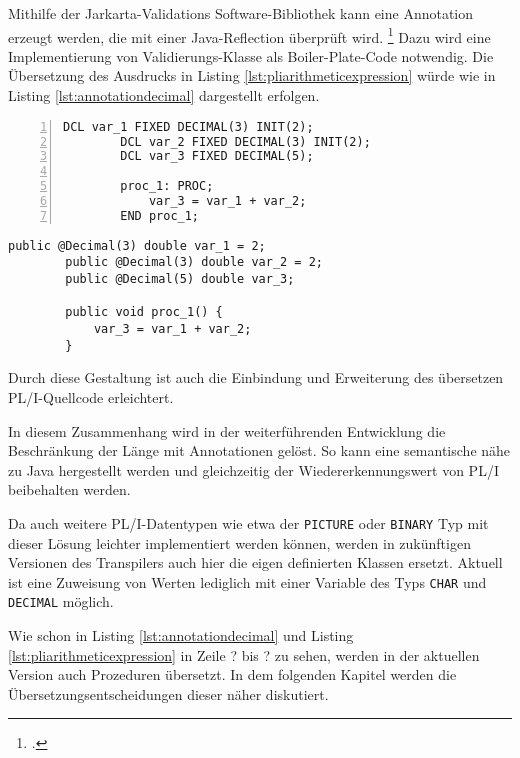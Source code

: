 Mithilfe der Jarkarta-Validations Software-Bibliothek kann eine Annotation erzeugt werden, die mit einer Java-Reflection überprüft wird. \footcite[Vgl. ][]{jakarta}
Dazu wird eine Implementierung von Validierungs-Klasse als Boiler-Plate-Code  notwendig. 
Die Übersetzung des Ausdrucks in Listing \ref{lst:pliarithmeticexpression} würde wie in Listing \ref{lst:annotationdecimal} dargestellt erfolgen.

\begin{minipage}[b]{0.5\linewidth}
	\centering
	\lstset{language=PL/I,label=SliceExaple}
	\begin{lstlisting}[frame=single, numbers=left, mathescape,%
		caption={Transformation DECIMAL}, label={lst:annotationdecimal}]
		DCL var_1 FIXED DECIMAL(3) INIT(2);
		DCL var_2 FIXED DECIMAL(3) INIT(2);
		DCL var_3 FIXED DECIMAL(5);
		
		proc_1: PROC;
			var_3 = var_1 + var_2;
		END proc_1;
	\end{lstlisting}
\end{minipage}
\hspace{0.5cm}
\begin{minipage}[b]{0.5\linewidth}
	\centering
	\lstset{language=Java,label=SliceExaple}
	\begin{lstlisting}[frame=single, mathescape,%
		title={}]
		public @Decimal(3) double var_1 = 2;
		public @Decimal(3) double var_2 = 2;
		public @Decimal(5) double var_3;
		
		public void proc_1() {
			var_3 = var_1 + var_2;
		}
	\end{lstlisting}
\end{minipage}

Durch diese Gestaltung ist auch die Einbindung und Erweiterung des übersetzen PL/I-Quellcode erleichtert.

In diesem Zusammenhang wird in der weiterführenden Entwicklung die Beschränkung der Länge mit Annotationen gelöst. So kann eine semantische nähe zu Java hergestellt werden und gleichzeitig der Wiedererkennungswert von PL/I beibehalten werden.

Da auch weitere PL/I-Datentypen wie etwa der \verb+PICTURE+ oder \verb+BINARY+ Typ mit dieser Lösung leichter implementiert werden können, werden in zukünftigen Versionen des Transpilers auch hier die eigen definierten Klassen ersetzt.
Aktuell ist eine Zuweisung von Werten lediglich mit einer Variable des Typs \verb+CHAR+ und \verb+DECIMAL+ möglich.

Wie schon in Listing \ref{lst:annotationdecimal} und Listing \ref{lst:pliarithmeticexpression}
in Zeile ? bis ? zu sehen, werden in der aktuellen Version auch Prozeduren übersetzt.
In dem folgenden Kapitel werden die Übersetzungsentscheidungen dieser näher diskutiert.

